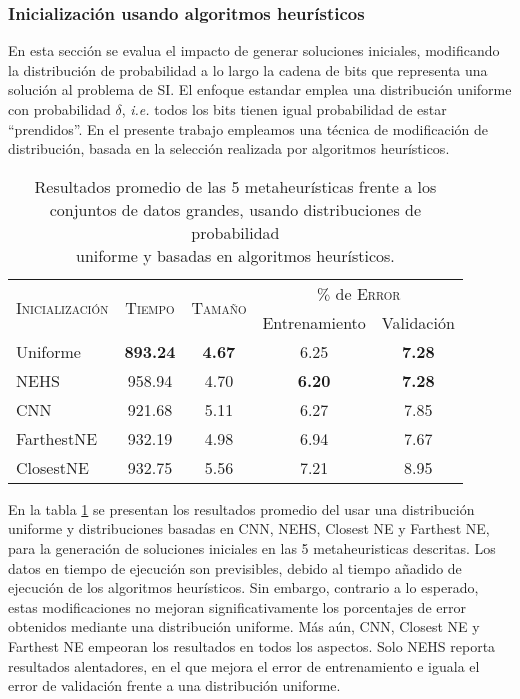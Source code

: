 \subsubsection{Inicialización usando algoritmos heurísticos}

En esta sección se evalua el impacto de generar soluciones iniciales, modificando la distribución de probabilidad a lo largo la cadena de bits que representa una solución al problema de SI. El enfoque estandar emplea una distribución uniforme con probabilidad $\delta$, \emph{i.e.} todos los bits tienen igual probabilidad de estar ``prendidos''. En el presente trabajo empleamos una técnica de modificación de distribución, basada en la selección realizada por algoritmos heurísticos.

\begin{table}[h!]
\centering
\begin{tabular}{l c c c c}
\hline
\multirow{2}{*}{\textsc{Inicialización}}
	& \multirow{2}{*}{\textsc{Tiempo}}
	& \multirow{2}{*}{\textsc{Tamaño}}
	& \multicolumn{2}{c}{$\%$ de \textsc{Error}} \\\cline{4-5}
 & & & \scriptsize{Entrenamiento} & \scriptsize{Validación} \\
\hline
\hline
Uniforme   & \textbf{893.24} & \textbf{4.67} & 6.25 & \textbf{7.28} \\
NEHS       & 958.94 & 4.70 & \textbf{6.20} & \textbf{7.28} \\
CNN        & 921.68 & 5.11 & 6.27 & 7.85 \\
FarthestNE & 932.19 & 4.98 & 6.94 & 7.67 \\
ClosestNE  & 932.75 & 5.56 & 7.21 & 8.95 \\
\hline
\end{tabular}
\caption[Resultados usando distribuciones uniforme y heurísticas]{Resultados promedio de las 5 metaheurísticas frente a los\\conjuntos de datos grandes, usando distribuciones de probabilidad\\uniforme y basadas en algoritmos heurísticos.}
\label{table-inits}
\end{table}

En la tabla \ref{table-inits} se presentan los resultados promedio del usar una distribución uniforme y distribuciones basadas en CNN, NEHS, Closest NE y Farthest NE, para la generación de soluciones iniciales en las 5 metaheuristicas descritas. Los datos en tiempo de ejecución son previsibles, debido al tiempo añadido de ejecución de los algoritmos heurísticos. Sin embargo, contrario a lo esperado, estas modificaciones no mejoran significativamente los porcentajes de error obtenidos mediante una distribución uniforme. Más aún, CNN, Closest NE y Farthest NE empeoran los resultados en todos los aspectos. Solo NEHS reporta resultados alentadores, en el que mejora el error de entrenamiento e iguala el error de validación frente a una distribución uniforme.

